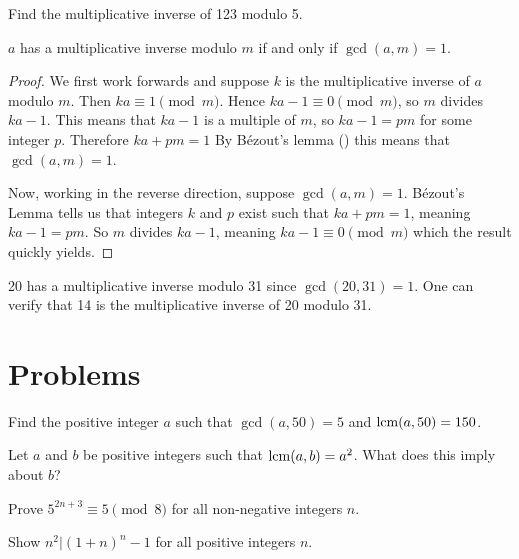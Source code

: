 \begin{exercise}
    Find the multiplicative inverse of 123 modulo 5.
\end{exercise}

\begin{proposition}\label{prop-multiplicative-inverse-exists-iff-coprime}
    $a$ has a multiplicative inverse modulo $m$ if and only if $\gcd(a,m) = 1$.
\end{proposition}
\begin{proof}
    We first work forwards and suppose $k$ is the multiplicative inverse of $a$ modulo $m$. Then $ka \equiv 1 \pmod m$. Hence $ka - 1 \equiv 0 \pmod m$, so $m$ divides $ka - 1$. This means that $ka - 1$ is a multiple of $m$, so $ka - 1 = pm$ for some integer $p$. Therefore $ka + pm = 1$ By B\'{e}zout's lemma () this means that $\gcd(a, m) = 1$.
    
    Now, working in the reverse direction, suppose $\gcd(a, m) = 1$. B\'{e}zout's Lemma tells us that integers $k$ and $p$ exist such that $ka + pm = 1$, meaning $ka - 1 = pm$. So $m$ divides $ka - 1$, meaning $ka - 1 \equiv 0 \pmod m$ which the result quickly yields.
\end{proof}

\begin{example}
    20 has a multiplicative inverse modulo 31 since $\gcd(20, 31) = 1$. One can verify that 14 is the multiplicative inverse of 20 modulo 31.
\end{example}

\newpage

\section{Problems}
\begin{problem}
    Find the positive integer $a$ such that $\gcd(a, 50) = 5$ and $\mathrm{lcm}(a, 50) = 150$.
\end{problem}

\begin{problem}
    Let $a$ and $b$ be positive integers such that $\mathrm{lcm}(a, b) = a^2$. What does this imply about $b$?
\end{problem}

\begin{problem}
    Prove $5^{2n+3} \equiv 5 \pmod 8$ for all non-negative integers $n$.
\end{problem}

\begin{problem}
    Show $n^2 \vert (1+n)^n - 1$ for all positive integers $n$.
\end{problem}

